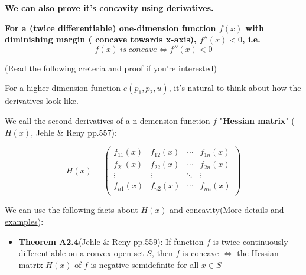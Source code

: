 \documentclass{article}
\begin{document}
\begin{mdframed}[backgroundcolor=blue!20,linecolor=white]
\textbf{We can also prove it's concavity using derivatives.} 

\vspace{2mm}

\textbf{For a (twice differentiable) one-dimension function $f(x)$ with diminishing margin (
concave towards x-axis), $f''(x)<0$, i.e.}
$$f(x) \ is \  concave \iff f''(x) < 0$$

\noindent\makebox[\linewidth]{\rule{12cm}{0.4pt}}

\vspace{2mm}

(Read the following creteria and proof if you're interested)

\vspace{2mm}

For a higher dimension function $e(p_1,p_2,u)$, it's natural to think about how the derivatives look like.


\vspace{2mm}

We call the second derivatives of a n-demension function $f$ "\textbf{Hessian matrix}" ($H(x)$, Jehle \& Reny pp.557):

\begin{equation}
H(x)=\left(
    \begin{array}{cccc}
		f_{11}(x) & f_{12}(x) & \cdots & f_{1n}(x) \\
		f_{21}(x) & f_{22}(x) & \cdots & f_{2n}(x) \\
		\vdots    &    \vdots & \ddots &   \vdots \\
		f_{n1}(x) & f_{n2}(x) & \cdots & f_{nn}(x) \\
    \end{array}
    \right)
\label{eq:hessian}   
\end{equation}

\vspace{2mm}

We can use the following facts about $H(x)$ and concavity(\href{https://mjo.osborne.economics.utoronto.ca/index.php/tutorial/index/1/qfs/t\#:~:text=Finally\%2C\%20the\%20matrix\%20has\%20one,namely\%20its\%20determinant\%2C\%20\%E2\%88\%9219.&text=A\%20is\%20positive\%20semidefinite\%20if,and\%20nonnegative\%20for\%20k\%20even.}{More details and examples}):

\begin{itemize}
\item  \textbf{Theorem A2.4}(Jehle \& Reny pp.559): If function $f$ is twice continuously differentiable on a convex open set $S$, then 
$f$ is concave $\iff$ the Hessian matrix $H(x)$ of $f$ is \href{https://towardsdatascience.com/what-is-a-positive-definite-matrix-181e24085abd}{negative semidefinite} for all $x \in S$


\end{itemize}
\end{mdframed}
\end{document}
